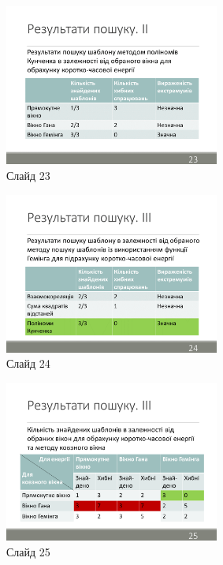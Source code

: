 \documentclass[pdftex]{thesis_utf8}
\begin{document}
\begin{figure}[h]
    \centering
    \includegraphics[width=0.63\textwidth]{slides/slide23.png}
    \caption{Слайд 23}
\end{figure}

\begin{figure}[h]
    \centering
    \includegraphics[width=0.63\textwidth]{slides/slide24.png}
    \caption{Слайд 24}
\end{figure}
\clearpage

\begin{figure}[h]
    \centering
    \includegraphics[width=0.63\textwidth]{slides/slide25.png}
    \caption{Слайд 25}
\end{figure}
\end{document}
